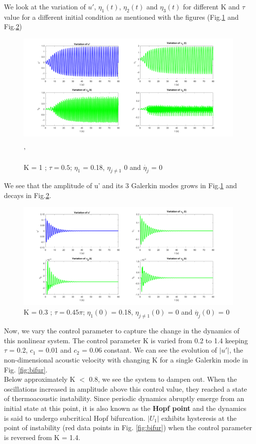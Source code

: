 \documentclass[8pt]{article} %
\begin{document}
We look at the variation of $u'$, $\eta_1 (t)$, $\eta_2 (t)$  and $\eta_3 (t)$ for different K and $\tau$ value for a different initial condition as mentioned with the figures (Fig.\ref{fig:fig5} and Fig.\ref{fig:fig6})
\begin{figure}[H]
    \centering
    \includegraphics[width=\linewidth]{fig5-k=1-tau=0.5}
    \caption{K = 1 ; $\tau = 0.5$; $\eta_1$ = 0.18, $\eta_{j\neq 1}$ 0 and $\dot{\eta_j}$ = 0}'
    \label{fig:fig5}
\end{figure}
We see that the amplitude of u' and its 3 Galerkin modes grows in Fig.\ref{fig:fig5}  and decays in Fig.\ref{fig:fig6}. 
\begin{figure}[H]
    \centering
    \includegraphics[width=\linewidth]{fig6}
     \caption{K = 0.3 ; $\tau = 0.45\pi$; $\eta_1 (0)$ = 0.18, $\eta_{j\neq 1} (0)$ = 0 and $\dot{\eta_j} (0)$ = 0}
    \label{fig:fig6}
\end{figure}
Now, we vary the control parameter to capture the change in the dynamics of this nonlinear system. The control parameter K is varied from 0.2 to 1.4 keeping $\tau$ = 0.2, $c_1$ = 0.01 and $c_2$ = 0.06 constant. We can see the evolution of $|u'|$, the non-dimensional acoustic velocity with changing K for a single Galerkin mode in Fig. \ref{fig:bifur}.\\
Below approximately K $<$ 0.8, we see the system to dampen out. When the oscillations increased in amplitude above this control value, they reached a state of thermoacoustic instability. Since periodic dynamics abruptly emerge from an initial state at this point, it is also known as the \textbf{Hopf point} and the dynamics is said to undergo subcritical Hopf bifurcation. $|U_1|$ exhibits hysteresis at the point of instability (red data points in Fig. \ref{fig:bifur}) when the control parameter is reversed from K = 1.4.
\end{document}
